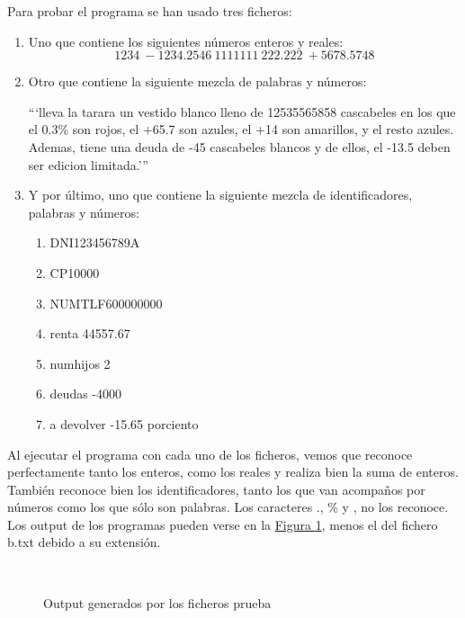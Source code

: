 \documentclass[10pt,a4paper,spanish]{report}
\begin{document}
Para probar el programa se han usado tres ficheros:
\begin{enumerate}[\color{p5}{$\heartsuit$}]
  \item Uno que contiene los siguientes números enteros y reales:
  \begin{displaymath}
  1234 ~ -1234.2546 ~ 1111111 ~ 222.222 ~ +5678.5748
  \end{displaymath}

  \item Otro que contiene la siguiente mezcla de palabras y números:

  ```lleva la tarara un vestido blanco lleno de 12535565858 cascabeles en los que el 0.3\% son rojos, el +65.7 son azules, el +14 son amarillos, y el resto azules. Ademas, tiene una deuda de -45 cascabeles blancos y de ellos, el -13.5 deben ser edicion limitada.'''

  \item Y por último, uno que contiene la siguiente mezcla de identificadores, palabras y números:
  \begin{enumerate}[\color{p5}{$\longrightarrow$}]
    \item DNI123456789A
    \item CP10000
    \item NUMTLF600000000
    \item renta 44557.67
    \item numhijos 2
    \item deudas -4000
    \item a devolver -15.65 porciento
  \end{enumerate}
\end{enumerate}

Al ejecutar el programa con cada uno de los ficheros, vemos que reconoce perfectamente tanto los enteros, como los reales y realiza bien la suma de enteros. También reconoce bien los identificadores, tanto los que van acompaños por números como los que sólo son palabras. Los caracteres ., \% y , no los reconoce. Los output de los programas pueden verse en la \hyperref[output]{Figura \ref*{output}}, menos el del fichero b.txt debido a su extensión.

\begin{figure}[!h]
\centering
\mbox {
\qquad
{}
}
\caption{Output generados por los ficheros prueba}
\label{output}
\end{figure}
\end{document}
